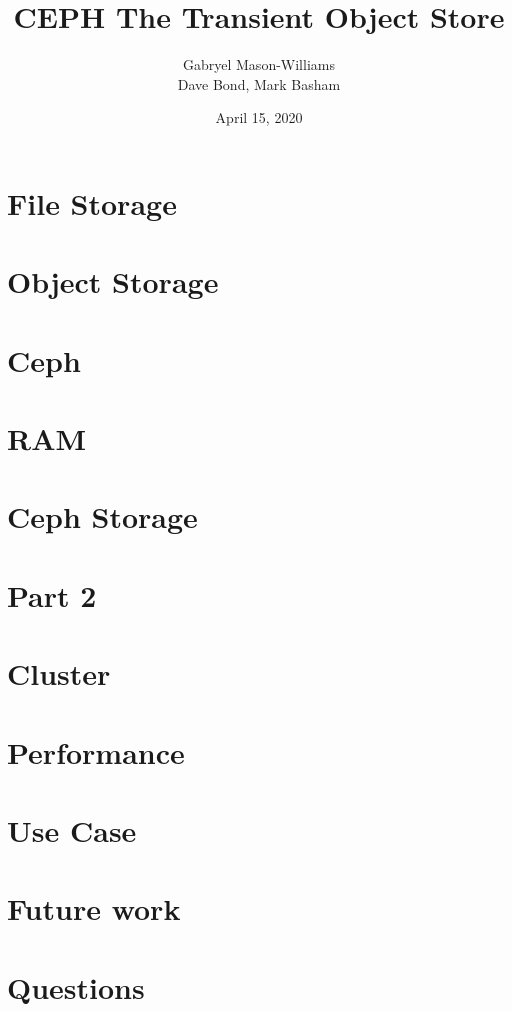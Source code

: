 \documentclass[notes,11pt]{beamer}
\title[RAM Based CEPH]{CEPH The Transient Object Store}
\date{April 15, 2020}
\author[me]{Gabryel Mason-Williams\\[3mm] Dave Bond, Mark Basham}
\begin{document}




\section{File Storage}

\section{Object Storage}

\section{Ceph} 

\section{RAM}

\section{Ceph Storage}

\section{Part 2}

\section{Cluster}

\section{Performance}

\section{Use Case}

\section{Future work}

\section{Questions}

\end{document}
